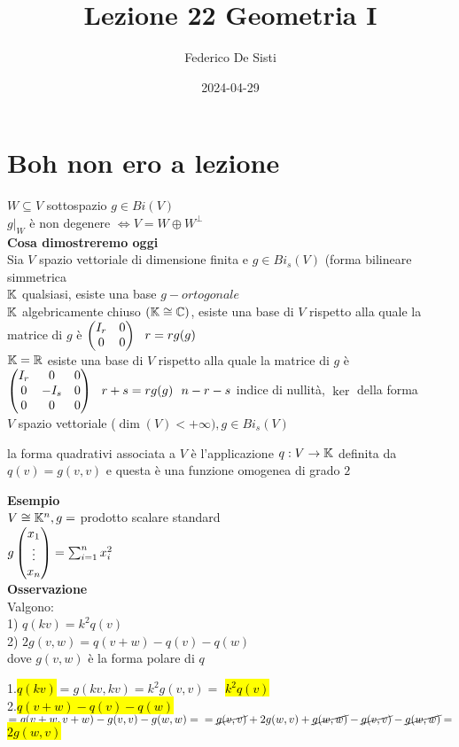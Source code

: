 \documentclass[12px]{article}
\title{Lezione 22 Geometria I}
\date{2024-04-29}
\author{Federico De Sisti}
\begin{document}
	\maketitle
	\newpage
	\section{Boh non ero a lezione}
	$W\subseteq V$ sottospazio $g\in Bi(V)$ \\
	$g|_W$ è non degenere $ \Leftrightarrow V = W\oplus W^\perp$\\
	\textbf{Cosa dimostreremo oggi}\\
	Sia $V$ spazio vettoriale di dimensione finita e $g\in Bi_s(V)$ (forma bilineare simmetrica\\
	 $\mathbb{K}$ qualsiasi, esiste una base $g-ortogonale$ \\
	 $\mathbb{K}$ algebricamente chiuso $(\mathbb{K}\cong \mathbb{C})$, esiste una base di $V $ rispetto alla quale la matrice di $g$ è $\begin{pmatrix}I_r & 0\\0 & 0 \end{pmatrix}\ \ r = rg(g)$\\
	 $\mathbb{K} = \mathbb{R}$ esiste una base di  $V$ rispetto alla quale la matrice di $g$ è $\begin{pmatrix}I_r& 0&0\\0&-I_s& 0\\0&0&0\end{pmatrix}\ \ r+s = rg(g) \ \ n - r - s$ indice di nullità, $\ker$ della forma\\
	 $V$ spazio vettoriale ($\dim(V)<+\infty),g\in Bi_s(V)$\\
	  \begin{defi}
	 	la forma quadrativi associata a $V$ è l'applicazione $q:V \rightarrow \mathbb{K}$ definita da $q(v) = g(v,v)$ e questa è una funzione omogenea di grado $2$
	 \end{defi}
	 \textbf{Esempio}\\
	 $V\cong \mathbb{K}^n, g = $ prodotto scalare standard\\
	 $g\begin{pmatrix}x_1\\\vdots\\x_n\end{pmatrix} = \sum^n_{i=1}x_i^2$\\
	 \textbf{Osservazione}\\
	 Valgono:\\
	 1) $q(kv) = k^2q(v)$ \\
	 2) $2g(v,w) = q(v+w) - q(v) - q(w)$\\
	 dove $g(v,w)$ è la forma polare di $q$
	  \begin{dimo}
		  1.\hl{$q(kv)$}$= g(kv,kv) = k^2g(v,v) =$ \hl{$k^2q(v)$}\\
		  2.\hl{$q(v+w)- q(v)-q(w)$} $=g(v+w,v+w) - g(v,v)-g(w,w)= \\
		  =\cancel{g(v,v)}+2g(w,v)+\cancel{g(w,w)}-\cancel{g(v,v)}-\cancel{g(w,w)}= $ \hl{$2g(w,v)$}
	 \end{dimo}
\end{document}
